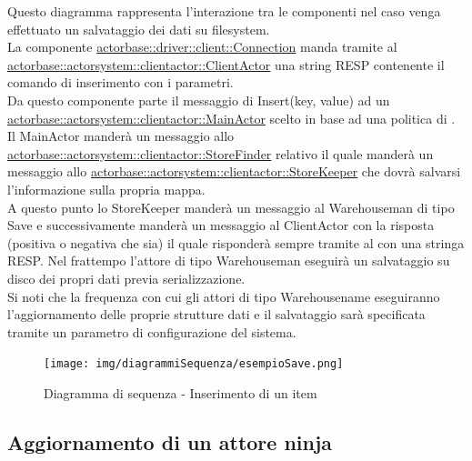 \documentclass{scalatekids-article}
\begin{document}
Questo diagramma rappresenta l'interazione tra le componenti nel caso venga 
effettuato un salvataggio dei dati su filesystem.\\
La componente \hyperref[sec:actorbase::driver::client::Connection]{actorbase::driver::client::Connection} 
manda tramite  al \hyperref[sec:actorbase::actorsystem::clientactor::ClientActor]{actorbase::actorsystem::clientactor::ClientActor} 
una string RESP contenente il comando di inserimento  con 
i parametri.\\ %
Da questo componente parte il messaggio di Insert(key, value) ad un \hyperref[sec:actorbase::actorsystem::clientactor::MainActor]{actorbase::actorsystem::clientactor::MainActor} scelto in base ad una 
politica di . Il MainActor manderà un messaggio allo \hyperref[sec:actorbase::actorsystem::clientactor::StoreFinder]{actorbase::actorsystem::clientactor::StoreFinder} relativo il quale manderà un messaggio allo \hyperref[sec:actorbase::actorsystem::clientactor::StoreKeeper]{actorbase::actorsystem::clientactor::StoreKeeper} che dovrà salvarsi l'informazione 
sulla propria mappa.\\
A questo punto lo StoreKeeper manderà un messaggio al Warehouseman di tipo Save e 
successivamente manderà un messaggio al ClientActor con la risposta 
(positiva o negativa che sia) il quale risponderà sempre tramite  al  con una stringa RESP.
Nel frattempo l'attore di tipo Warehouseman eseguirà un salvataggio su disco dei propri dati previa serializzazione.\\
Si noti che la frequenza con cui gli attori di tipo Warehousename eseguiranno 
l'aggiornamento delle proprie strutture dati e il salvataggio sarà specificata 
tramite un parametro di configurazione del sistema.\\
\begin{figure}[H]
  \begin{center}
    \texttt{[image: img/diagrammiSequenza/esempioSave.png]}
    \caption{Diagramma di sequenza - Inserimento di un item}
  \end{center}
\end{figure}

\subsection{Aggiornamento di un attore ninja}
\end{document}
